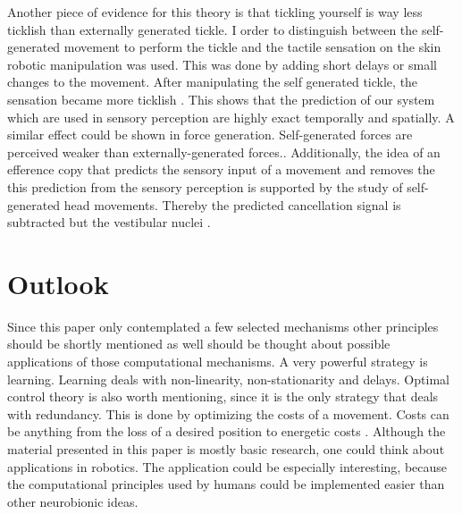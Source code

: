 \documentclass{SeminarV2}
\begin{document}
Another piece of evidence for this theory is that tickling yourself is way less ticklish than externally generated tickle. I order to distinguish between the self-generated movement to perform the tickle and the tactile sensation on the skin robotic manipulation was used. This was done by adding short delays or small changes to the movement. After manipulating the self generated tickle, the sensation became more ticklish \cite{blakemore1999spatio}. This shows that the prediction of our system which are used in sensory perception are highly exact temporally and spatially. 
A similar effect could be shown in force generation. Self-generated forces are perceived weaker than externally-generated forces.\cite{franklin2011computational}. Additionally, the idea of an efference copy that predicts the sensory input of a movement and removes the this prediction from the sensory perception is supported by the study of self-generated head movements. Thereby the predicted cancellation signal is subtracted but the vestibular nuclei \cite{roy2001selective}\cite{cullen2004signal} .
 
 

\section{Outlook}

Since this paper only contemplated a few selected mechanisms other principles should be shortly mentioned as well should be thought about possible applications of those computational mechanisms. A very powerful strategy is learning. Learning deals with non-linearity, non-stationarity and delays. Optimal control theory is also worth mentioning, since it is the only strategy that deals with redundancy. This is done by optimizing the costs of a movement\cite{franklin2011computational}. Costs can be anything from the loss of a desired position to energetic costs \cite{franklin2011computational}. \newline
Although the material presented in this paper is mostly basic research, one could think about applications in robotics. The application could be especially interesting, because the computational principles used by humans could be implemented easier than other neurobionic ideas.



 






\end{document}
